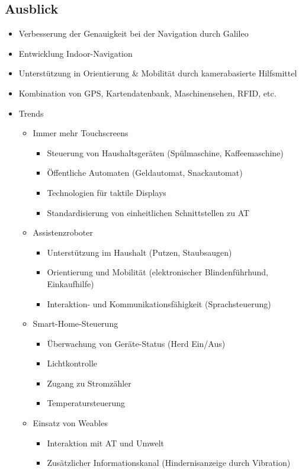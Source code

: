 \documentclass[paper=a4, fontsize=11pt]{scrartcl} %
\numberwithin{equation}{section} %
\numberwithin{figure}{section} %
\numberwithin{table}{section} %
\begin{document}
\subsection{Ausblick}

\begin{itemize}
\item Verbesserung der Genauigkeit bei der Navigation durch Galileo
\item Entwicklung Indoor-Navigation
\item Unterstützung in Orientierung \& Mobilität durch kamerabasierte Hilfsmittel
\item Kombination von GPS, Kartendatenbank, Maschinensehen, RFID, etc.
\item Trends
\begin{itemize}
\item Immer mehr Touchscreens
\begin{itemize}
\item Steuerung von Haushaltsgeräten (Spülmaschine, Kaffeemaschine)
\item Öffentliche Automaten (Geldautomat, Snackautomat)
\item Technologien für taktile Displays
\item Standardisierung von einheitlichen Schnittstellen zu AT
\end{itemize}
\item Assistenzroboter
\begin{itemize}
\item Unterstützung im Haushalt (Putzen, Staubsaugen)
\item Orientierung und Mobilität (elektronischer Blindenführhund, Einkaufhilfe)
\item Interaktion- und Kommunikationsfähigkeit (Sprachsteuerung)
\end{itemize}
\item Smart-Home-Steuerung
\begin{itemize}
\item Überwachung von Geräte-Status (Herd Ein/Aus)
\item Lichtkontrolle
\item Zugang zu Stromzähler
\item Temperatursteuerung
\end{itemize}
\item Einsatz von Weables
\begin{itemize}
\item Interaktion mit AT und Umwelt
\item Zusätzlicher Informationskanal (Hindernisanzeige durch Vibration)

\end{itemize}
\end{itemize}
\end{itemize}
\end{document}
